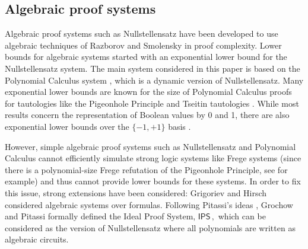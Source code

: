 \documentclass[11pt]{article}
\begin{document}
%
\subsection{Algebraic proof systems} %
Algebraic proof systems such as Nullstellensatz %
have been  %
developed to use
%
algebraic techniques of Razborov and Smolensky \cite{Razborov87-eng, Smolensky87}
%
in proof complexity.  %
Lower bounds for algebraic systems started with an exponential lower bound for the Nullstellensatz \cite{BeameIKPP96} system. The main system considered in this paper is based on the Polynomial Calculus system \cite{CEI96}, which is a dynamic version of Nullstellensatz. Many exponential lower bounds are known for the size of Polynomial Calculus proofs for tautologies like the Pigeonhole Principle \cite{MR1691494,IPS99} and Tseitin tautologies \cite{BussGIP01}. While most results concern the representation of Boolean values by 0 and 1, there are also exponential lower bounds over the $\{-1, +1\}$ basis \cite{Sok20}. 

However, simple algebraic proof systems such as Nullstellensatz and Polynomial Calculus cannot
efficiently %
%
%
simulate strong logic systems like Frege systems (since there is a %
%
polynomial-size
%
Frege refutation of the Pigeonhole Principle, see \cite{CR79} for example) and thus cannot %
provide lower bounds for these systems. In order to fix this issue, strong extensions
%
have been %
considered: Grigoriev and Hirsch \cite{GH03} considered algebraic systems over formulas.
%
%
%
%
%
Following Pitassi's ideas \cite{Pit97, Pit98}, Grochow and Pitassi \cite{GP14} formally
defined the Ideal Proof System, %
$\mathsf{IPS}\,,$ %
%
which can be considered as the version of Nullstellensatz where all polynomials are written as  algebraic
circuits. %
\end{document}
